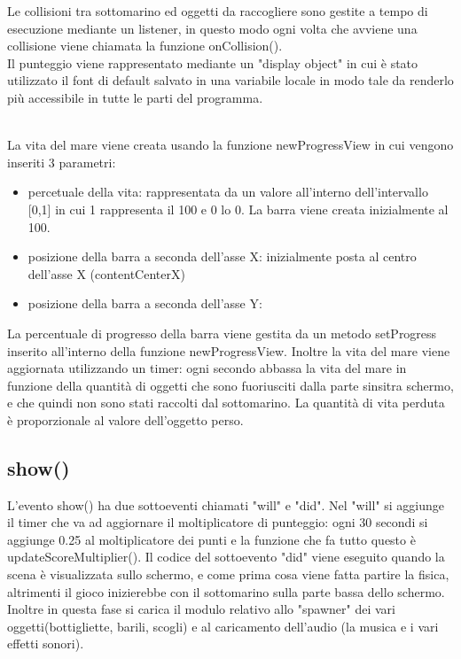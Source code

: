 \documentclass[12pt]{article}
\begin{document}
Le collisioni tra sottomarino ed oggetti da raccogliere sono gestite a tempo di esecuzione mediante un listener, in questo modo ogni volta che avviene una collisione viene chiamata la funzione onCollision(). 
\\

Il punteggio viene rappresentato mediante un "display object" in cui è stato utilizzato il font di default salvato in una variabile locale in modo tale da renderlo più accessibile in tutte le parti del programma. 

\\
La vita del mare viene creata usando la funzione newProgressView in cui vengono inseriti 3 parametri:
\begin{itemize}
    \item percetuale della vita: rappresentata da un valore all'interno dell'intervallo [0,1] in cui 1 rappresenta il 100 e 0 lo 0. La barra viene creata inizialmente al 100.
    \item posizione della barra a seconda dell'asse X: inizialmente posta al centro dell'asse X (contentCenterX)
    \item posizione della barra a seconda dell'asse Y: 
\end{itemize}
La percentuale di progresso della barra viene gestita da un metodo setProgress inserito all'interno della funzione newProgressView.
Inoltre la vita del mare viene aggiornata utilizzando un timer: ogni secondo abbassa la vita del mare in funzione della quantità 
di oggetti che sono fuoriusciti dalla parte sinsitra schermo, e che quindi non sono stati raccolti dal sottomarino. 
La quantità di vita perduta è proporzionale al valore dell'oggetto perso.

\subsection{show()}
L'evento show() ha due sottoeventi chiamati "will" e "did". Nel "will" si aggiunge il timer che va ad aggiornare il moltiplicatore 
di punteggio: ogni 30 secondi si aggiunge 0.25 al moltiplicatore dei punti e la funzione che fa tutto questo è updateScoreMultiplier().
 Il codice del sottoevento "did" viene eseguito quando la scena è visualizzata sullo schermo, e come prima cosa viene fatta partire 
 la fisica, altrimenti il gioco inizierebbe con il sottomarino sulla parte bassa dello schermo. Inoltre in questa fase si carica 
 il modulo relativo allo "spawner" dei vari oggetti(bottigliette, barili, scogli) e al caricamento dell'audio (la musica e i vari effetti sonori).
\end{document}
